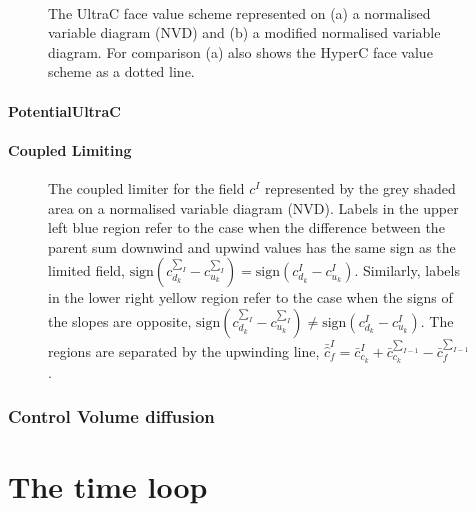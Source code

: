 \begin{figure}[tbp]
\begin{center}
 \\ \vspace{0.5cm}
\caption{The UltraC face value scheme represented on (a) a normalised variable diagram (NVD) and (b) a modified normalised variable diagram.  For comparison (a) also shows the HyperC face value scheme as a dotted line.}
\label{fig:ultrac}
\end{center}
\end{figure}

\paragraph{PotentialUltraC}

\paragraph{Coupled Limiting}

\begin{figure}[tbp]
\begin{center}
\caption{The coupled limiter for the field $c^I$ represented by the grey shaded area on a normalised variable diagram (NVD).  Labels in the upper left blue region refer to the case when the difference between the parent sum downwind and upwind values has the same sign as the limited field, $\text{sign}\left(c^{\sum_{I}}_{d_k}-c^{\sum_{I}}_{u_k}\right) = \text{sign}\left(c^{I}_{d_k}-c^{I}_{u_k}\right)$.  Similarly, labels in the lower right yellow region refer to the case when the signs of the slopes are opposite, $\text{sign}\left(c^{\sum_{I}}_{d_k}-c^{\sum_{I}}_{u_k}\right) \neq \text{sign}\left(c^{I}_{d_k}-c^{I}_{u_k}\right)$. The regions are separated by the upwinding line, $\bar{\hat{c}}^{I}_{f} = \bar{c}^{I}_{c_k} + \bar{c}^{\sum_{I-1}}_{c_k} - \bar{c}^{\sum_{I-1}}_{f}$.}
\label{fig:coupledlimiter}
\end{center}
\end{figure}

\subsubsection{Control Volume diffusion}

\section{The time loop}
\label{sect:ND_time_loop}

